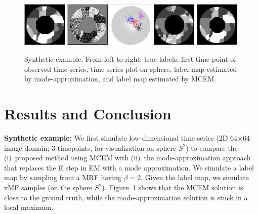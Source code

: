 \documentclass[runningheads, a4paper]{llncs}
\begin{document}
\begin{figure}[!t]
  \centering
  \includegraphics[width=0.19\textwidth]{figures/synthetic/true}
  \includegraphics[width=0.19\textwidth]{figures/synthetic/obs}
  \includegraphics[width=0.19\textwidth]{figures/synthetic/sphere1}
  \includegraphics[width=0.19\textwidth]{figures/synthetic/label_icm}
  \includegraphics[width=0.19\textwidth]{figures/synthetic/label_mc}
  \caption{Synthetic example. From left to right: true labels, first
    time point of observed time series, time series plot on sphere,
    label map estimated by mode-approximation, and label map estimated by MCEM.}
  \label{fig:toy}
\end{figure}


\section{Results and Conclusion}
\label{sec:exp}


\textbf{Synthetic example:} We first simulate low-dimensional time series (2D
64$\times$64 image domain; 3 timepoints, for visualization on sphere $S^2$) to
compare the (i)~proposed method using MCEM with (ii)~the mode-approximation
approach that replaces the E step in EM with a mode approximation. We simulate a
label map by sampling from a MRF having $\beta = 2$. Given the label map, we
simulate vMF samples (on the sphere $S^2$). Figure~\ref{fig:toy} shows that the
MCEM solution is close to the ground truth, while the mode-approximation
solution is stuck in a local maximum.
\end{document}
